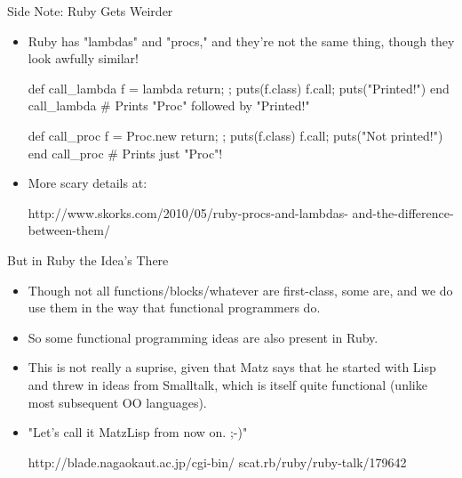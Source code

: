 \documentclass[xcolor=dvipsnames]{beamer}          %
\begin{document}
\begin{frame}[fragile]{Side Note: Ruby Gets Weirder}
\begin{itemize}
    \item Ruby has "lambdas" and "procs," and they're not the same
        thing, though they look awfully similar!
        \begin{rlisting}
            def call_lambda
                f = lambda { return; };     puts(f.class)
                f.call;                     puts("Printed!")
            end
            call_lambda  # Prints "Proc" followed by "Printed!"

            def call_proc
                f = Proc.new { return; };   puts(f.class)
                f.call;                     puts("Not printed!")
            end
            call_proc    # Prints just "Proc"!
        \end{rlisting}
    \item More scary details at:
        \begin{olisting}
            http://www.skorks.com/2010/05/ruby-procs-and-lambdas-
              and-the-difference-between-them/
        \end{olisting}
\end{itemize}
\end{frame}


\begin{frame}[fragile]{But in Ruby the Idea's There}
\begin{itemize}
    \item Though not all functions/blocks/whatever are first-class,
        some are, and we do use them in the way that functional
        programmers do.
    \item So some functional programming ideas are also present in Ruby.
    \item This is not really a suprise, given that Matz says that he
        started with Lisp and threw in ideas from Smalltalk, which is
        itself quite functional (unlike most subsequent OO languages).
    \item "Let's call it MatzLisp from now on. ;-)"
        \begin{olisting}
            http://blade.nagaokaut.ac.jp/cgi-bin/
              scat.rb/ruby/ruby-talk/179642
        \end{olisting}
\end{itemize}
\end{frame}
\end{document}
